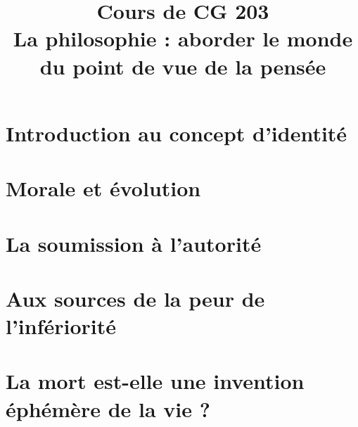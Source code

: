 \documentclass[a4paper,10pt]{article}
\title{\textbf{Cours de CG 203} \\
	La philosophie : aborder le monde du point de vue de la pensée}
\date{}
\begin{document}
\maketitle

\tableofcontents

\newpage

\section{Introduction au concept d'identité}
	

\section{Morale et évolution}
	

\section{La soumission à l'autorité}
	

\section{Aux sources de la peur de l'infériorité}
	

\section{La mort est-elle une invention éphémère de la vie ?}
	
\end{document}
